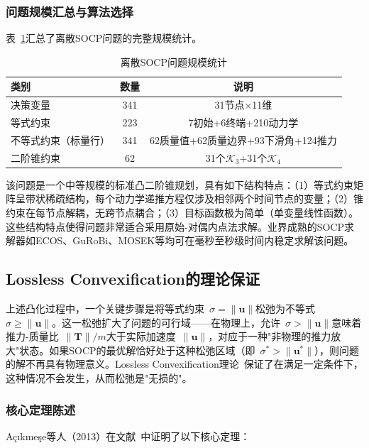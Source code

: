 \subsubsection{问题规模汇总与算法选择}

表~\ref{tab:problem_size}汇总了离散SOCP问题的完整规模统计。

\begin{table}[H]
\centering
\caption{离散SOCP问题规模统计}
\label{tab:problem_size}
\begin{tabular}{lcc}
\hline
\textbf{类别} & \textbf{数量} & \textbf{说明} \\
\hline
决策变量 & 341 & 31节点$\times$11维 \\
等式约束 & 223 & 7初始+6终端+210动力学 \\
不等式约束（标量行） & 341 & 62质量值+62质量边界+93下滑角+124推力 \\
二阶锥约束 & 62 & 31个$\mathcal K_3$+31个$\mathcal K_4$ \\
\hline
\end{tabular}
\end{table}

该问题是一个中等规模的标准凸二阶锥规划，具有如下结构特点：（1）等式约束矩阵呈带状稀疏结构，每个动力学递推方程仅涉及相邻两个时间节点的变量；（2）锥约束在每节点解耦，无跨节点耦合；（3）目标函数极为简单（单变量线性函数）。这些结构特点使得问题非常适合采用原始-对偶内点法求解。业界成熟的SOCP求解器如ECOS、GuRoBi、MOSEK等均可在毫秒至秒级时间内稳定求解该问题。

\subsection{Lossless Convexification的理论保证}\label{sec:lossless}

上述凸化过程中，一个关键步骤是将等式约束~$\sigma=\|\bm u\|$松弛为不等式~$\sigma\ge\|\bm u\|$。这一松弛扩大了问题的可行域——在物理上，允许~$\sigma>\|\bm u\|$意味着推力-质量比~$\|\bm T\|/m$大于实际加速度~$\|\bm u\|$，对应于一种"非物理的推力放大"状态。如果SOCP的最优解恰好处于这种松弛区域（即~$\sigma^*>\|\bm u^*\|$），则问题的解不再具有物理意义。Lossless Convexification理论~\cite{blackmore2012lossless}保证了在满足一定条件下，这种情况不会发生，从而松弛是"无损的"。

\subsubsection{核心定理陈述}

A\c{c}{\i}kme\c{s}e等人（2013）在文献~{\cite{acikmese2013}}中证明了以下核心定理：

